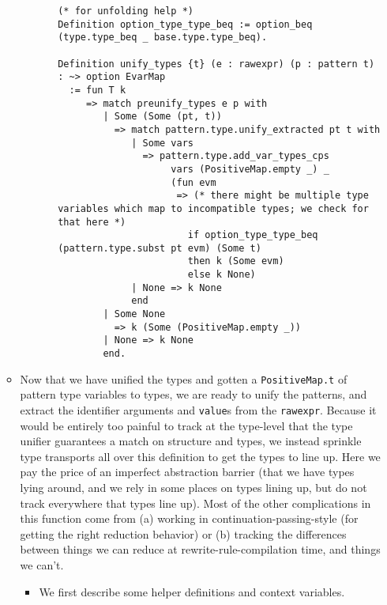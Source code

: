 \begin{itemize}
\begin{itemize}
\begin{itemize}
\begin{itemize}
\begin{verbatim}
(* for unfolding help *)
Definition option_type_type_beq := option_beq (type.type_beq _ base.type.type_beq).

Definition unify_types {t} (e : rawexpr) (p : pattern t) : ~> option EvarMap
  := fun T k
     => match preunify_types e p with
        | Some (Some (pt, t))
          => match pattern.type.unify_extracted pt t with
             | Some vars
               => pattern.type.add_var_types_cps
                    vars (PositiveMap.empty _) _
                    (fun evm
                     => (* there might be multiple type variables which map to incompatible types; we check for that here *)
                       if option_type_type_beq (pattern.type.subst pt evm) (Some t)
                       then k (Some evm)
                       else k None)
             | None => k None
             end
        | Some None
          => k (Some (PositiveMap.empty _))
        | None => k None
        end.
\end{verbatim}
      \end{itemize}
    \end{itemize}
  \item
    Now that we have unified the types and gotten a
    \texttt{PositiveMap.t} of pattern type variables to types, we are
    ready to unify the patterns, and extract the identifier arguments
    and \texttt{value}s from the \texttt{rawexpr}. Because it would be
    entirely too painful to track at the type-level that the type
    unifier guarantees a match on structure and types, we instead
    sprinkle type transports all over this definition to get the types
    to line up. Here we pay the price of an imperfect abstraction
    barrier (that we have types lying around, and we rely in some places
    on types lining up, but do not track everywhere that types line up).
    Most of the other complications in this function come from (a)
    working in continuation-passing-style (for getting the right
    reduction behavior) or (b) tracking the differences between things
    we can reduce at rewrite-rule-compilation time, and things we can't.

    \begin{itemize}
    \item
      We first describe some helper definitions and context variables.


\end{itemize}
\end{itemize}
\end{itemize}
